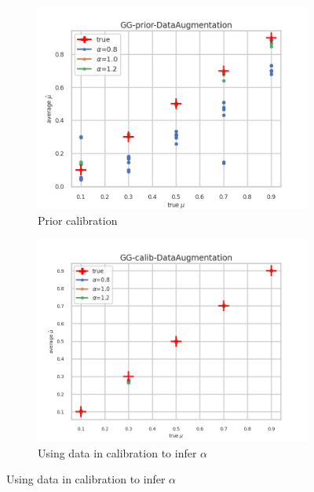 \begin{figure}[ht!]
  \centering
  \begin{subfigure}[t]{0.49\linewidth}
    \includegraphics[width=\linewidth]{COMPARE/GG-prior/DataAugmentation/profusion_true_mu_target_mean.png}
    \caption{Prior calibration}
  \end{subfigure}%
  \hfill
  \begin{subfigure}[t]{0.49\linewidth}
    \includegraphics[width=\linewidth]{COMPARE/GG-calib/DataAugmentation/profusion_true_mu_target_mean.png}
    \caption{Using data in calibration to infer $\alpha$}
  \end{subfigure}


\end{figure}
